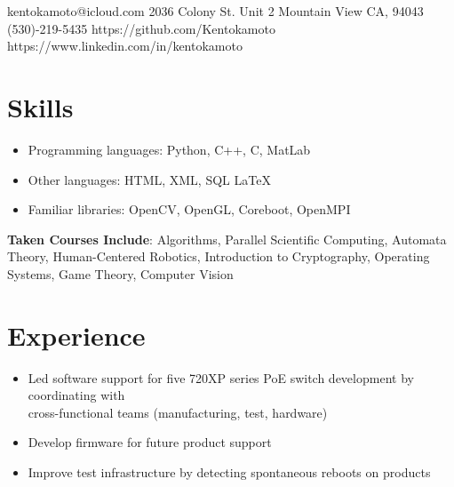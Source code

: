 \documentclass{Custom_CV}
\begin{document}
{kentokamoto@icloud.com}
{2036 Colony St. Unit 2}
{Mountain View CA, 94043}
{(530)-219-5435}
{https://github.com/Kentokamoto}
{https://www.linkedin.com/in/kentokamoto}

\section{Skills}

\begin{itemize}[noitemsep]
\item Programming languages: Python, C++, C, MatLab
\item Other languages: HTML, XML, SQL \LaTeX
\item Familiar libraries: OpenCV, OpenGL, Coreboot, OpenMPI
\end{itemize}

\textbf{Taken Courses Include}:
Algorithms, Parallel Scientific Computing, Automata Theory, Human-Centered Robotics, Introduction to Cryptography, Operating Systems, Game Theory, Computer Vision

\section{Experience}
\begin{itemize}[noitemsep]
    \item Led software support for five 720XP series PoE switch development by coordinating with\\ cross-functional teams (manufacturing, test, hardware)
    \item Develop firmware for future product support
    \item Improve test infrastructure by detecting spontaneous reboots on products
\end{itemize}
\end{document}

